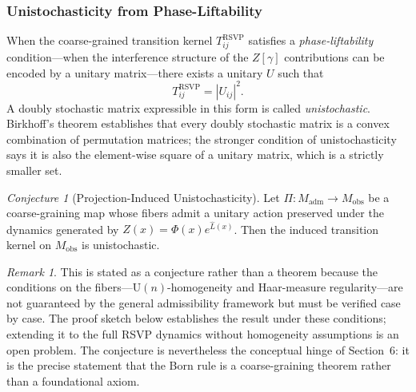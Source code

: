 \documentclass[12pt,a4paper]{article}
\theoremstyle{remark}
\newtheorem{conjecture}{Conjecture}[section]
\newtheorem{remark}{Remark}[section]
\begin{document}
\subsubsection*{Unistochasticity from Phase-Liftability}

 When the coarse-grained transition kernel $T_{ij}^{\mathrm{RSVP}}$
satisfies a \emph{phase-liftability} condition---when the interference
structure of the $Z[\gamma]$ contributions can be encoded by a unitary
matrix---there exists a unitary $U$ such that
\begin{equation}
  T_{ij}^{\mathrm{RSVP}} = |U_{ij}|^2.
  \label{eq:unistochastic}
\end{equation}
A doubly stochastic matrix expressible in this form is called
\emph{unistochastic}. Birkhoff's theorem establishes that every doubly
stochastic matrix is a convex combination of permutation matrices; the
stronger condition of unistochasticity says it is also the element-wise
square of a unitary matrix, which is a strictly smaller set.

\begin{conjecture}[Projection-Induced Unistochasticity]
Let $\Pi : M_{\mathrm{adm}} \to M_{\mathrm{obs}}$ be a coarse-graining
map whose fibers admit a unitary action preserved under the dynamics
generated by $Z(x) = \Phi(x)e^{\widehat{L}(x)}$. Then the induced
transition kernel on $M_{\mathrm{obs}}$ is unistochastic.
\end{conjecture}

\begin{remark}
This is stated as a conjecture rather than a theorem because the
conditions on the fibers---$\mathrm{U}(n)$-homogeneity and
Haar-measure regularity---are not guaranteed by the general admissibility
framework but must be verified case by case. The proof sketch below
establishes the result under these conditions; extending it to the
full RSVP dynamics without homogeneity assumptions is an open problem.
The conjecture is nevertheless the conceptual hinge of Section~6: it
is the precise statement that the Born rule is a coarse-graining theorem
rather than a foundational axiom.
\end{remark}
\end{document}

